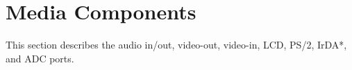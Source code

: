 \documentclass[11pt, twoside, pdftex]{article}
\newcommand{\commonFiles}{../../../common/doc}
\begin{document}



\section{Media Components}
\label{sec:multi}

This section describes the audio in/out, video-out, video-in, LCD, PS/2, IrDA*, and ADC ports.











\end{document}
